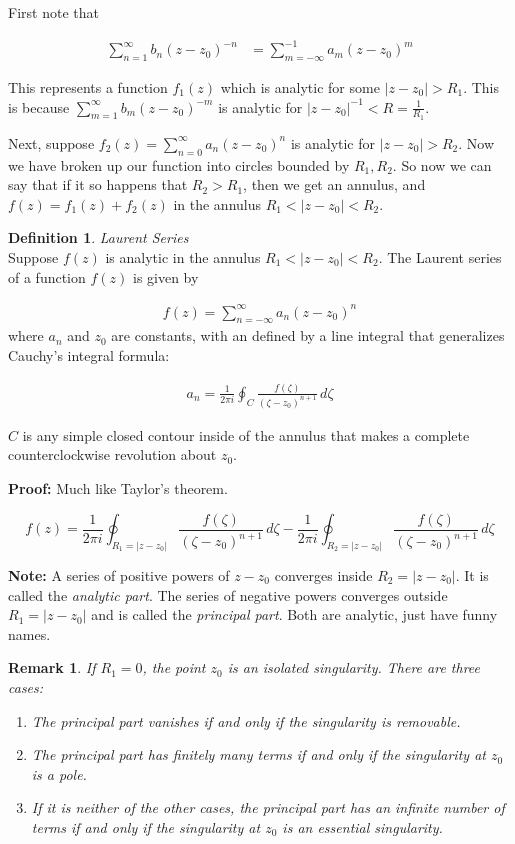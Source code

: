 \documentclass{article}
\newtheorem*{remark}{Remark}
\theoremstyle{definition}
\newtheorem{definition}{Definition}[section]
\newcommand{\Def}[2]{
\begin{shaded*}
\begin{definition}{\textit{#1}}\\#2\end{definition}
\end{shaded*}
}
\begin{document}
First note that 

\begin{align}
\sum_{n=1}^\infty b_n(z-z_0)^{-n} & = \sum_{m=-\infty}^{-1} a_m (z-z_0)^m
\end{align}

This represents a function $f_1(z)$ which is analytic for some $|z-z_0|>R_1$. This is because $\sum_{m=1}^\infty b_m(z-z_0)^{-m}$ is analytic for $|z-z_0|^{-1}<R = \frac{1}{R_1}$. 

Next, suppose $f_2(z) = \sum_{n=0}^\infty a_n(z-z_0)^n$ is analytic for $|z-z_0|>R_2$. Now we have broken up our function into circles bounded by $R_1, R_2$. So now we can say that if it so happens that $R_2>R_1$, then we get an annulus, and $f(z) = f_1(z) + f_2(z)$ in the annulus $R_1  < |z-z_0| < R_2$. 

\Def{Laurent Series}{
Suppose $f(z)$ is analytic in the annulus $R_1  < |z-z_0| < R_2$. 
The Laurent series of a function $f(z)$ is given by

\begin{align}
f(z)=\sum _{n=-\infty }^{\infty }a_{n}(z-z_0)^{n}
\end{align}
where $a_n$ and $z_0$ are constants, with an defined by a line integral that generalizes Cauchy's integral formula:

\begin{align}
a_{n}={\frac {1}{2\pi i}}\oint _{C }{\frac {f(\zeta)}{(\zeta-z_0)^{n+1}}}\,d\zeta
\end{align}

$C$ is any simple closed contour inside of the annulus that makes a complete counterclockwise revolution about $z_0$. 


\textbf{Proof:} Much like Taylor's theorem. 

$$f(z) = {\frac {1}{2\pi i}}\oint _{R_1  = |z-z_0| }{\frac {f(\zeta)}{(\zeta-z_0)^{n+1}}}\,d\zeta - {\frac {1}{2\pi i}}\oint _{R_2  = |z-z_0| }{\frac {f(\zeta)}{(\zeta-z_0)^{n+1}}}\,d\zeta $$
}

\textbf{Note:} A series of positive powers of $z-z_0$ converges inside $R_2  = |z-z_0|$. It is called the \textit{analytic part}. The series of negative powers converges outside $R_1  = |z-z_0|$ and is called the \textit{principal part}. Both are analytic, just have funny names. 

\begin{remark}
If $R_1 = 0$, the point $z_0$ is an isolated singularity. There are three cases:
\begin{enumerate}
	\item The principal part vanishes if and only if the singularity is removable.
	\item The principal part has finitely many terms if and only if the singularity at $z_0$ is a pole.
	\item If it is neither of the other cases, the principal part has an infinite number of terms if and only if the singularity at $z_0$ is an essential singularity. 
\end{enumerate}
\end{remark}
\end{document}
